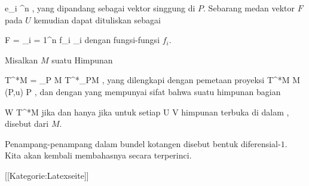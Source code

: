 \mavergleichskette
{\vergleichskette
{ e_i
}
{ \in }{ \R^n
}
{  }{
}
{    }{
}
{   }{
}
}
{}{}{,}
yang dipandang sebagai vektor singgung di $P$. Sebarang medan vektor $F$ pada $U$ kemudian dapat dituliskan sebagai

\mavergleichskette
{\vergleichskette
{ F
}
{ = }{ \sum_{i = 1}^n  f_i \partial_i
}
{  }{
}
{    }{
}
{   }{
}
}
{}{}{}
dengan fungsi-fungsi $f_i$.

{}
{

Misalkan $M$ suatu
Himpunan

\mavergleichskettedisp
{\vergleichskette
{ T^*M
}
{ =} {\biguplus_{P \in M} T^*_PM
}
{ } {
}
{ } {
}
{ } {
}
}
{}{}{,}
yang dilengkapi dengan pemetaan proyeksi
\maabbeledisp {\pi} { T^*M } { M
} { (P,u) } { P
} {,}
dan dengan
yang mempunyai sifat bahwa suatu himpunan bagian

\mavergleichskette
{\vergleichskette
{ W
}
{ \subseteq }{ T^*M
}
{  }{
}
{    }{
}
{   }{
}
}
{}{}{}
jika dan hanya jika untuk setiap
\maabbdisp {\alpha} { U } { V
} {}
himpunan
terbuka di dalam
,
disebut  dari $M$.

}
Penampang-penampang dalam bundel kotangen disebut bentuk diferensial-$1$. Kita akan kembali membahasnya secara terperinci.

 [[Kategorie:Latexseite]]
